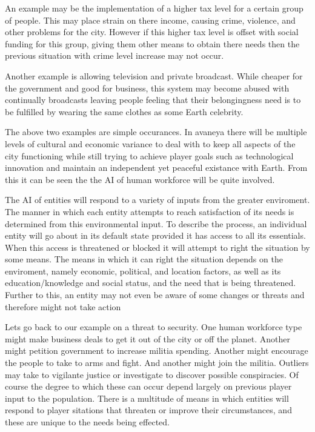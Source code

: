 An example may be the implementation of a higher tax level for a certain group of people. This may place strain on there income, causing crime, violence, and other problems for the city. However if this higher tax level is offset with social funding for this group, giving them other means to obtain there needs then the previous situation with crime level increase may not occur. 

Another example is allowing television and private broadcast. While cheaper for the government and good for business, this system may become abused with continually broadcasts leaving people feeling that their belongingness need is to be fulfilled by wearing the same clothes as some Earth celebrity. 

The above two examples are simple occurances. In avaneya there will be multiple levels of cultural and economic variance to deal with to keep all aspects of the city functioning while still trying to achieve player goals such as technological innovation and maintain an independent yet peaceful existance with Earth. From this it can be seen the the AI of human workforce will be quite involved.   

The AI of entities will respond to a variety of inputs from the greater enviroment. The manner in which each entity attempts to reach satisfaction of its needs is determined from this environmental input. To describe the process, an individual entity will go about in its default state provided it has access to all its essentials. When this access is threatened or blocked it will attempt to right the situation by some means. The means in which it can right the situation depends on the enviroment, namely economic, political, and location factors, as well as its education/knowledge and social status, and the need that is being threatened. Further to this, an entity may not even be aware of some changes or threats and therefore might not take action

Lets go back to our example on a threat to security. One human workforce type might make business deals to get it out of the city or off the planet. Another might petition government to increase militia spending. Another might encourage the people to take to arms and fight. And another might join the militia. Outliers may take to vigilante justice or investigate to discover possible conspiracies. Of course the degree to which these can occur depend largely on previous player input to the population. There is a multitude of means in which entities will respond to player sitations that threaten or improve their circumstances, and these are unique to the needs being effected.

